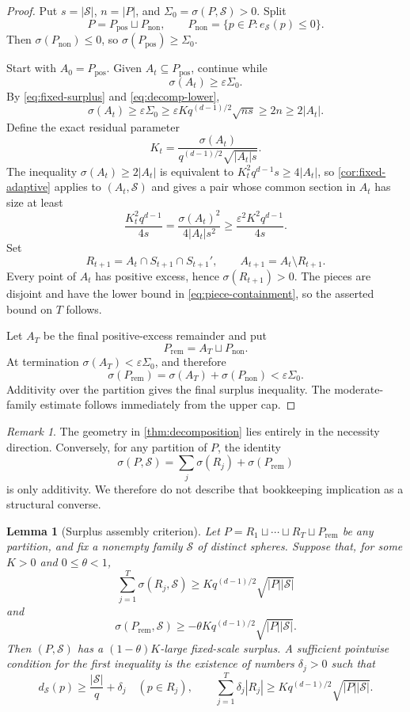 \documentclass[11pt,letterpaper]{amsart}
\newtheorem{lemma}[lemma]{Lemma}
\theoremstyle{definition}
\theoremstyle{remark}
\newtheorem{remark}[remark]{Remark}
\newcommand{\1}{\mathbf 1}
\newcommand{\eps}{\varepsilon}
\begin{document}
\begin{proof}
Put $s=|\mathcal S|$, $n=|P|$, and $\Sigma_0=\sigma(P,\mathcal S)>0$.  Split
\[
 P=P_{\mathrm{pos}}\sqcup P_{\mathrm{non}},
 \qquad
 P_{\mathrm{non}}=\{p\in P:e_{\mathcal S}(p)\le0\}.
\]
Then $\sigma(P_{\mathrm{non}})\le0$, so $\sigma(P_{\mathrm{pos}})\ge\Sigma_0$.

Start with $A_0=P_{\mathrm{pos}}$.  Given $A_t\subseteq P_{\mathrm{pos}}$, continue while
\[
 \sigma(A_t)\ge\eps\Sigma_0.
\]
By \eqref{eq:fixed-surplus} and \eqref{eq:decomp-lower},
\[
 \sigma(A_t)\ge\eps\Sigma_0
 \ge\eps Kq^{(d-1)/2}\sqrt{ns}
 \ge2n\ge2|A_t|.
\]
Define the exact residual parameter
\[
 K_t=\frac{\sigma(A_t)}{q^{(d-1)/2}\sqrt{|A_t|s}}.
\]
The inequality $\sigma(A_t)\ge2|A_t|$ is equivalent to $K_t^2q^{d-1}s\ge4|A_t|$, so \cref{cor:fixed-adaptive} applies to $(A_t,\mathcal S)$ and gives a pair whose common section in $A_t$ has size at least
\[
 \frac{K_t^2q^{d-1}}{4s}
 =\frac{\sigma(A_t)^2}{4|A_t|s^2}
 \ge\frac{\eps^2K^2q^{d-1}}{4s}.
\]
Set
\[
 R_{t+1}=A_t\cap S_{t+1}\cap S_{t+1}',
 \qquad A_{t+1}=A_t\setminus R_{t+1}.
\]
Every point of $A_t$ has positive excess, hence $\sigma(R_{t+1})>0$.  The pieces are disjoint and have the lower bound in \eqref{eq:piece-containment}, so the asserted bound on $T$ follows.

Let $A_T$ be the final positive-excess remainder and put
\[
 P_{\mathrm{rem}}=A_T\sqcup P_{\mathrm{non}}.
\]
At termination $\sigma(A_T)<\eps\Sigma_0$, and therefore
\[
 \sigma(P_{\mathrm{rem}})
 =\sigma(A_T)+\sigma(P_{\mathrm{non}})
 <\eps\Sigma_0.
\]
Additivity over the partition gives the final surplus inequality.  The moderate-family estimate follows immediately from the upper cap.
\end{proof}

\begin{remark}\label{rem:decomp-converse}
The geometry in \cref{thm:decomposition} lies entirely in the necessity direction.  Conversely, for any partition of $P$, the identity
\[
 \sigma(P,\mathcal S)=\sum_j\sigma(R_j)+\sigma(P_{\mathrm{rem}})
\]
is only additivity.  We therefore do not describe that bookkeeping implication as a structural converse.
\end{remark}

\begin{lemma}[Surplus assembly criterion]\label{lem:assembly}
Let $P=R_1\sqcup\cdots\sqcup R_T\sqcup P_{\mathrm{rem}}$ be any partition, and fix a nonempty family $\mathcal S$ of distinct spheres.  Suppose that, for some $K>0$ and $0\le\theta<1$,
\[
 \sum_{j=1}^T\sigma(R_j,\mathcal S)
 \ge Kq^{(d-1)/2}\sqrt{|P||\mathcal S|}
\]
and
\[
 \sigma(P_{\mathrm{rem}},\mathcal S)
 \ge-\theta Kq^{(d-1)/2}\sqrt{|P||\mathcal S|}.
\]
Then $(P,\mathcal S)$ has a $(1-\theta)K$-large fixed-scale surplus.  A sufficient pointwise condition for the first inequality is the existence of numbers $\delta_j>0$ such that
\[
 d_{\mathcal S}(p)\ge\frac{|\mathcal S|}{q}+\delta_j
 \quad(p\in R_j),
 \qquad
 \sum_{j=1}^T\delta_j|R_j|
 \ge Kq^{(d-1)/2}\sqrt{|P||\mathcal S|}.
\]
\end{lemma}
\end{document}
